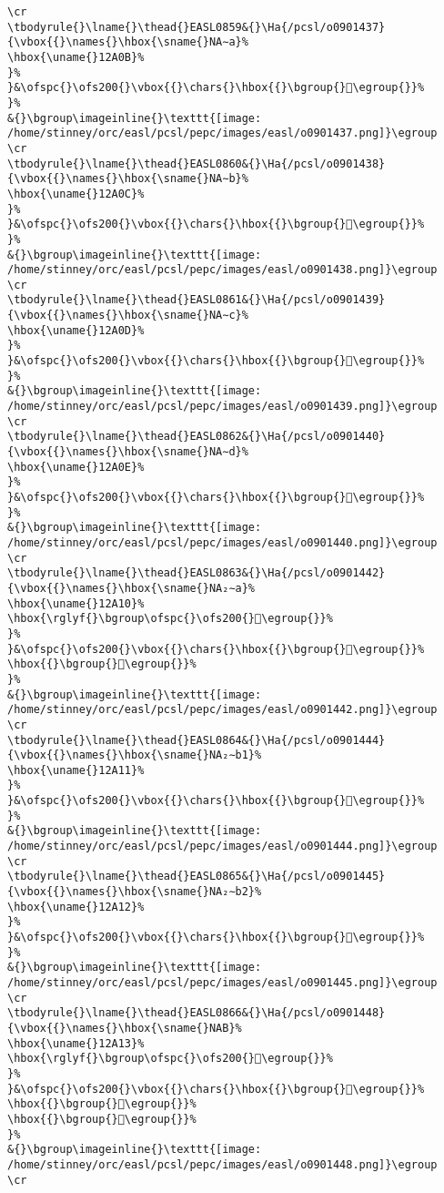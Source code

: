 \begin{verbatim}
\cr
\tbodyrule{}\lname{}\thead{}EASL0859&{}\Ha{/pcsl/o0901437}{\vbox{{}\names{}\hbox{\sname{}NA∼a}%
\hbox{\uname{}12A0B}%
}%
}&\ofspc{}\ofs200{}\vbox{{}\chars{}\hbox{{}\bgroup{}𒨋\egroup{}}%
}%
&{}\bgroup\imageinline{}\texttt{[image: /home/stinney/orc/easl/pcsl/pepc/images/easl/o0901437.png]}\egroup
\cr
\tbodyrule{}\lname{}\thead{}EASL0860&{}\Ha{/pcsl/o0901438}{\vbox{{}\names{}\hbox{\sname{}NA∼b}%
\hbox{\uname{}12A0C}%
}%
}&\ofspc{}\ofs200{}\vbox{{}\chars{}\hbox{{}\bgroup{}𒨌\egroup{}}%
}%
&{}\bgroup\imageinline{}\texttt{[image: /home/stinney/orc/easl/pcsl/pepc/images/easl/o0901438.png]}\egroup
\cr
\tbodyrule{}\lname{}\thead{}EASL0861&{}\Ha{/pcsl/o0901439}{\vbox{{}\names{}\hbox{\sname{}NA∼c}%
\hbox{\uname{}12A0D}%
}%
}&\ofspc{}\ofs200{}\vbox{{}\chars{}\hbox{{}\bgroup{}𒨍\egroup{}}%
}%
&{}\bgroup\imageinline{}\texttt{[image: /home/stinney/orc/easl/pcsl/pepc/images/easl/o0901439.png]}\egroup
\cr
\tbodyrule{}\lname{}\thead{}EASL0862&{}\Ha{/pcsl/o0901440}{\vbox{{}\names{}\hbox{\sname{}NA∼d}%
\hbox{\uname{}12A0E}%
}%
}&\ofspc{}\ofs200{}\vbox{{}\chars{}\hbox{{}\bgroup{}𒨎\egroup{}}%
}%
&{}\bgroup\imageinline{}\texttt{[image: /home/stinney/orc/easl/pcsl/pepc/images/easl/o0901440.png]}\egroup
\cr
\tbodyrule{}\lname{}\thead{}EASL0863&{}\Ha{/pcsl/o0901442}{\vbox{{}\names{}\hbox{\sname{}NA₂∼a}%
\hbox{\uname{}12A10}%
\hbox{\rglyf{}\bgroup\ofspc{}\ofs200{}𒨐\egroup{}}%
}%
}&\ofspc{}\ofs200{}\vbox{{}\chars{}\hbox{{}\bgroup{}𒨏\egroup{}}%
\hbox{{}\bgroup{}𒨐\egroup{}}%
}%
&{}\bgroup\imageinline{}\texttt{[image: /home/stinney/orc/easl/pcsl/pepc/images/easl/o0901442.png]}\egroup
\cr
\tbodyrule{}\lname{}\thead{}EASL0864&{}\Ha{/pcsl/o0901444}{\vbox{{}\names{}\hbox{\sname{}NA₂∼b1}%
\hbox{\uname{}12A11}%
}%
}&\ofspc{}\ofs200{}\vbox{{}\chars{}\hbox{{}\bgroup{}𒨑\egroup{}}%
}%
&{}\bgroup\imageinline{}\texttt{[image: /home/stinney/orc/easl/pcsl/pepc/images/easl/o0901444.png]}\egroup
\cr
\tbodyrule{}\lname{}\thead{}EASL0865&{}\Ha{/pcsl/o0901445}{\vbox{{}\names{}\hbox{\sname{}NA₂∼b2}%
\hbox{\uname{}12A12}%
}%
}&\ofspc{}\ofs200{}\vbox{{}\chars{}\hbox{{}\bgroup{}𒨒\egroup{}}%
}%
&{}\bgroup\imageinline{}\texttt{[image: /home/stinney/orc/easl/pcsl/pepc/images/easl/o0901445.png]}\egroup
\cr
\tbodyrule{}\lname{}\thead{}EASL0866&{}\Ha{/pcsl/o0901448}{\vbox{{}\names{}\hbox{\sname{}NAB}%
\hbox{\uname{}12A13}%
\hbox{\rglyf{}\bgroup\ofspc{}\ofs200{}𒨓\egroup{}}%
}%
}&\ofspc{}\ofs200{}\vbox{{}\chars{}\hbox{{}\bgroup{}𒨓\egroup{}}%
\hbox{{}\bgroup{}𒨔\egroup{}}%
\hbox{{}\bgroup{}𒨕\egroup{}}%
}%
&{}\bgroup\imageinline{}\texttt{[image: /home/stinney/orc/easl/pcsl/pepc/images/easl/o0901448.png]}\egroup
\cr

\end{verbatim}
